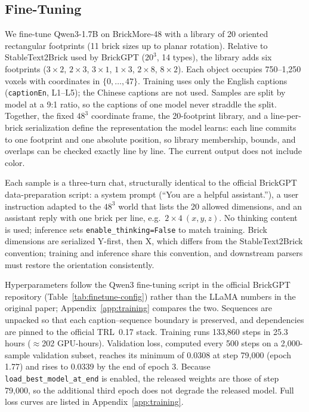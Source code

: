 \documentclass[letterpaper]{article} %
\begin{document}
\subsection{Fine-Tuning}
\label{sec:training}
We fine-tune Qwen3-1.7B on BrickMore-48 with a library of 20 oriented rectangular footprints (11 brick sizes up to planar rotation). Relative to StableText2Brick used by BrickGPT ($20^3$, 14 types), the library adds six footprints ($3{\times}2$, $2{\times}3$, $3{\times}1$, $1{\times}3$, $2{\times}8$, $8{\times}2$). Each object occupies 750--1,250 voxels with coordinates in $\{0,\ldots,47\}$. Training uses only the English captions (\texttt{captionEn}, L1--L5); the Chinese captions are not used. Samples are split by model at a 9:1 ratio, so the captions of one model never straddle the split. Together, the fixed $48^3$ coordinate frame, the 20-footprint library, and a line-per-brick serialization define the representation the model learns: each line commits to one footprint and one absolute position, so library membership, bounds, and overlaps can be checked exactly line by line. The current output does not include color.

Each sample is a three-turn chat, structurally identical to the official BrickGPT data-preparation script: a system prompt (``You are a helpful assistant.''), a user instruction adapted to the $48^3$ world that lists the 20 allowed dimensions, and an assistant reply with one brick per line, e.g.\ $2{\times}4\ (x,y,z)$. No thinking content is used; inference sets \texttt{enable\_thinking=False} to match training. Brick dimensions are serialized Y-first, then X, which differs from the StableText2Brick convention; training and inference share this convention, and downstream parsers must restore the orientation consistently.

Hyperparameters follow the Qwen3 fine-tuning script in the official BrickGPT repository (Table~\ref{tab:finetune-config}) rather than the LLaMA numbers in the original paper; Appendix~\ref{app:training} compares the two. Sequences are unpacked so that each caption--sequence boundary is preserved, and dependencies are pinned to the official TRL~0.17 stack. Training runs 133,860 steps in 25.3 hours ($\approx$202 GPU-hours). Validation loss, computed every 500 steps on a 2,000-sample validation subset, reaches its minimum of 0.0308 at step 79,000 (epoch 1.77) and rises to 0.0339 by the end of epoch 3. Because \texttt{load\_best\_model\_at\_end} is enabled, the released weights are those of step 79,000, so the additional third epoch does not degrade the released model. Full loss curves are listed in Appendix~\ref{app:training}.
\end{document}
